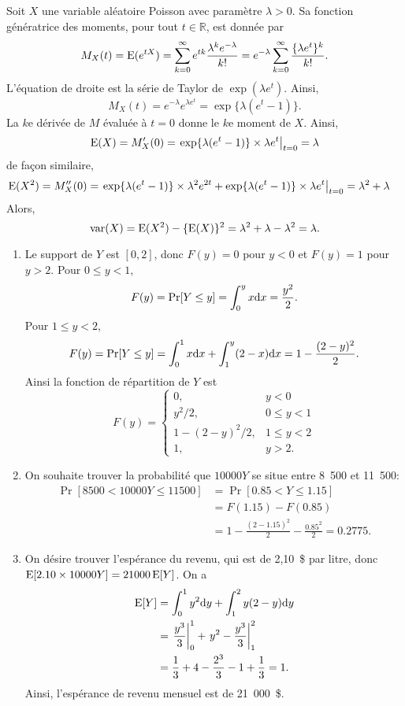 \begin{solution}{1.5}
Soit $X$ une variable aléatoire Poisson avec paramètre $\lambda>0$. Sa fonction génératrice des moments, pour tout $t \in \mathbb{R}$, est donnée par
\begin{align*}
M_X(t) = \operatorname{E} (e^{tX}) = \sum_{k=0}^\infty e^{tk}\frac{\lambda^k e^{-\lambda}}{k!} =  e^{-\lambda}\sum_{k=0}^\infty \frac{\{\lambda e^t\}^k}{k!}.
\end{align*}
L'équation de droite est la série de Taylor de $\exp(\lambda e^t)$. Ainsi,
$$
M_X(t) = e^{-\lambda}e^{\lambda e^t} = \exp\{\lambda(e^t-1)\}.
$$
La $k$e dérivée de $M$ évaluée à $t=0$ donne le $k$e moment de $X$. Ainsi,
$$
\operatorname{E}(X) = M^\prime_X(0) = \left.\exp\{\lambda(e^t-1)\}\times \lambda e^t\right|_{t=0} = \lambda
$$
de façon similaire,
\begin{align*}
\operatorname{E}(X^2) & = M^{\prime \prime}_X(0) = \left.\exp\{\lambda(e^t-1)\}\times \lambda^2 e^{2t}+\exp\{\lambda(e^t-1)\}\times \lambda e^{t}\right|_{t=0} = \lambda^2+\lambda
\end{align*}
Alors,
$$
\operatorname{var}(X) = \operatorname{E}(X^2) - \{\operatorname{E}(X)\}^2 = \lambda^2+\lambda-\lambda^2=\lambda.
$$
\end{solution}
\begin{solution}{1.6}
\begin{enumerate}
\item Le support de $Y$ est $[0,2]$, donc $F(y)=0$ pour $y<0$ et $F(y)=1$ pour $y>2$. Pour $0\leq y <1$,
$$
F(y)=\Pr[Y\leq y]=\int_0^y x\mbox{d} x = \frac{y^2}{2}.
$$
Pour $1\leq y <2$,
$$
F(y)=\Pr[Y\leq y]=\int_0^1 x\mbox{d} x +\int_1^y (2-x)\mbox{d} x = 1-\frac{(2-y)^2}{2}.
$$
Ainsi la fonction de répartition de $Y$ est
$$
F(y)= \begin{cases}
0, & y<0\\
y^2/2, & 0\leq y<1\\
1- (2-y)^2/2, & 1\leq y <2\\
1, & y>2.
\end{cases}
$$

\item On souhaite trouver la probabilité que $10000 Y$ se situe entre 8~500 et 11~500:
\begin{align*}
\Pr[8500<10000Y\leq 11500] & = \Pr[0.85<Y\leq 1.15]\\
&=F(1.15)-F(0.85)\\
&=1- \frac{(2-1.15)^2}{2}-\frac{0.85^2}{2}=0.2775.
\end{align*}

\item On désire trouver l'espérance du revenu, qui est de 2,10~\$ par litre, donc $\operatorname{E}[2.10\times 10000Y]=21000\operatorname{E}[Y]$. On a
\begin{align*}
\operatorname{E}[Y]&=\int_0^1 y^2\mbox{d} y +\int_1^2 y(2-y)\mbox{d} y\\
&=\left.\frac{y^3}{3}\right|_0^1+\left.y^2-\frac{y^3}{3}\right|_1^2\\
&=\frac{1}{3}+4-\frac{2^3}{3}-1+\frac{1}{3} = 1.
\end{align*}
Ainsi, l'espérance de revenu mensuel est de 21~000~\$.
\end{enumerate}
\end{solution}

